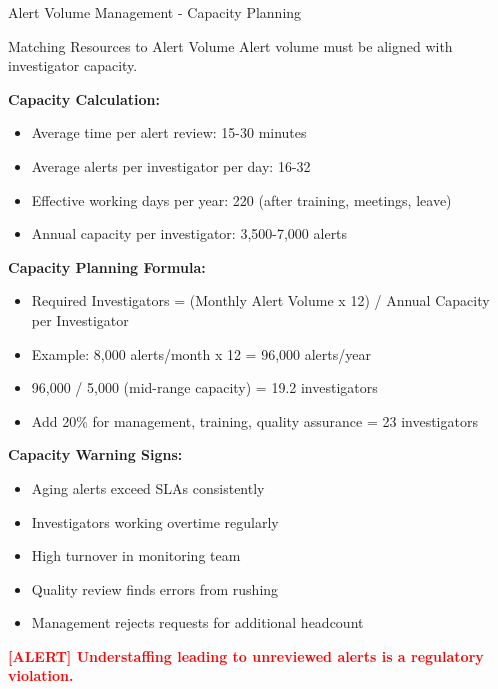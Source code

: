 \documentclass[11pt,a4paper]{beamer}
\newcommand{\redflag}[1]{\textcolor{red}{\textbf{[ALERT] #1}}}
\begin{document}
	\begin{frame}{Alert Volume Management - Capacity Planning}
	\begin{block}{Matching Resources to Alert Volume}
		Alert volume must be aligned with investigator capacity.
	\end{block}
	
	\textbf{Capacity Calculation:}
	\begin{itemize}
		\item Average time per alert review: 15-30 minutes
		\item Average alerts per investigator per day: 16-32
		\item Effective working days per year: 220 (after training, meetings, leave)
		\item Annual capacity per investigator: 3,500-7,000 alerts
	\end{itemize}
	
	\textbf{Capacity Planning Formula:}
	\begin{itemize}
		\item Required Investigators = (Monthly Alert Volume x 12) / Annual Capacity per Investigator
		\item Example: 8,000 alerts/month x 12 = 96,000 alerts/year
		\item 96,000 / 5,000 (mid-range capacity) = 19.2 investigators
		\item Add 20\% for management, training, quality assurance = 23 investigators
	\end{itemize}
	
	\textbf{Capacity Warning Signs:}
	\begin{itemize}
		\item Aging alerts exceed SLAs consistently
		\item Investigators working overtime regularly
		\item High turnover in monitoring team
		\item Quality review finds errors from rushing
		\item Management rejects requests for additional headcount
	\end{itemize}
	
	\redflag{Understaffing leading to unreviewed alerts is a regulatory violation.}
	\end{frame}
	
\end{document}
